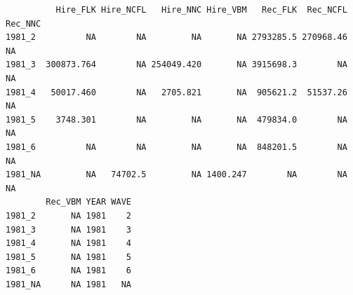 \documentclass[
  letterpaper,
  oneside,
  open=any]{scrbook}
\newenvironment{Shaded}{\begin{snugshade}}{\end{snugshade}}
\newcommand{\CommentTok}[1]{\textcolor[rgb]{0.37,0.37,0.37}{#1}}
\newcommand{\DecValTok}[1]{\textcolor[rgb]{0.68,0.00,0.00}{#1}}
\newcommand{\FunctionTok}[1]{\textcolor[rgb]{0.28,0.35,0.67}{#1}}
\newcommand{\NormalTok}[1]{\textcolor[rgb]{0.00,0.23,0.31}{#1}}
\newcommand{\OtherTok}[1]{\textcolor[rgb]{0.00,0.23,0.31}{#1}}
\newcommand{\SpecialCharTok}[1]{\textcolor[rgb]{0.37,0.37,0.37}{#1}}
\begin{document}
\begin{Shaded}
\end{Shaded}

\begin{verbatim}
          Hire_FLK Hire_NCFL   Hire_NNC Hire_VBM   Rec_FLK  Rec_NCFL Rec_NNC
1981_2          NA        NA         NA       NA 2793285.5 270968.46      NA
1981_3  300873.764        NA 254049.420       NA 3915698.3        NA      NA
1981_4   50017.460        NA   2705.821       NA  905621.2  51537.26      NA
1981_5    3748.301        NA         NA       NA  479834.0        NA      NA
1981_6          NA        NA         NA       NA  848201.5        NA      NA
1981_NA         NA   74702.5         NA 1400.247        NA        NA      NA
        Rec_VBM YEAR WAVE
1981_2       NA 1981    2
1981_3       NA 1981    3
1981_4       NA 1981    4
1981_5       NA 1981    5
1981_6       NA 1981    6
1981_NA      NA 1981   NA
\end{verbatim}

\begin{Shaded}
\end{Shaded}
\end{document}
